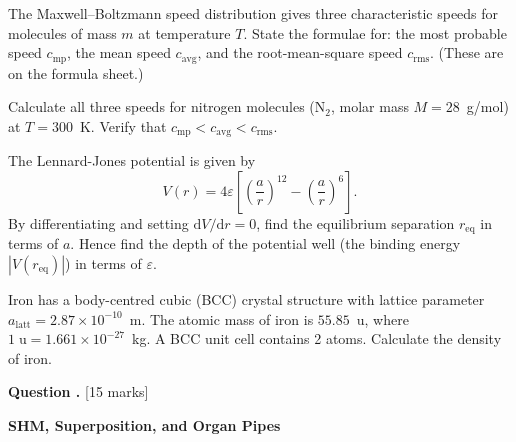 \documentclass[12pt,a4paper]{article}
\newcounter{questioncounter}
\newcommand{\question}[1]{%
  \stepcounter{questioncounter}%
  \vspace{0.5cm}%
  \noindent\textbf{Question \thequestioncounter.} \hfill [#1 marks]%
  \vspace{0.2cm}%
  \par%
}
\begin{document}
\begin{parts}
\item The Maxwell--Boltzmann speed distribution gives three characteristic speeds for molecules of mass $m$ at temperature $T$. State the formulae for: the most probable speed $c_\mathrm{mp}$, the mean speed $c_\mathrm{avg}$, and the root-mean-square speed $c_\mathrm{rms}$. (These are on the formula sheet.) 

\item Calculate all three speeds for nitrogen molecules (N$_2$, molar mass $M = 28$~g/mol) at $T = 300$~K. Verify that $c_\mathrm{mp} < c_\mathrm{avg} < c_\mathrm{rms}$. 

\item The Lennard-Jones potential is given by
\[
V(r) = 4\varepsilon\left[\left(\frac{a}{r}\right)^{12} - \left(\frac{a}{r}\right)^{6}\right].
\]
By differentiating and setting $\mathrm{d}V/\mathrm{d}r = 0$, find the equilibrium separation $r_\mathrm{eq}$ in terms of $a$. Hence find the depth of the potential well (the binding energy $|V(r_\mathrm{eq})|$) in terms of $\varepsilon$. 

\item Iron has a body-centred cubic (BCC) crystal structure with lattice parameter $a_\mathrm{latt} = 2.87 \times 10^{-10}$~m. The atomic mass of iron is $55.85$~u, where $1\;\text{u} = 1.661 \times 10^{-27}$~kg. A BCC unit cell contains 2 atoms. Calculate the density of iron. 
\end{parts}

\newpage

\question{15}

\noindent\textbf{SHM, Superposition, and Organ Pipes}
\end{document}
